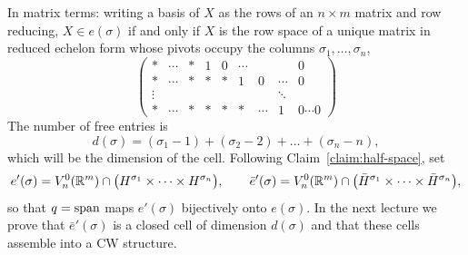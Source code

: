 In matrix terms: writing a basis of $X$ as the rows of an $n\times m$ matrix and
row reducing, $X\in e(\sigma)$ if and only if $X$ is the row space of a unique
matrix in reduced echelon form whose pivots occupy the columns
$\sigma_1,\dots,\sigma_n$,
\[
\begin{pmatrix}
*&\cdots&*&1&0&\cdots& & &0\\
*&\cdots&*&*&*&1&0&\cdots&0\\
\vdots& & & & & & &\ddots&\\
*&\cdots&*&*&*&*&\cdots&1&0\cdots 0
\end{pmatrix}
\]
The number of free entries is
\[
d(\sigma)=(\sigma_1-1)+(\sigma_2-2)+\dots+(\sigma_n-n),
\]
which will be the dimension of the cell. Following
Claim~\ref{claim:half-space}, set
\[
e'(\sigma)=V^0_n(\mathbb{R}^m)\cap\big(H^{\sigma_1}\times\dots\times H^{\sigma_n}\big),
\qquad
\bar e'(\sigma)=V^0_n(\mathbb{R}^m)\cap\big(\bar H^{\sigma_1}\times\dots\times
\bar H^{\sigma_n}\big),
\]
so that $q=\operatorname{span}$ maps $e'(\sigma)$ bijectively onto $e(\sigma)$. In the next
lecture we prove that $\bar e'(\sigma)$ is a closed cell of dimension
$d(\sigma)$ and that these cells assemble into a CW structure.
